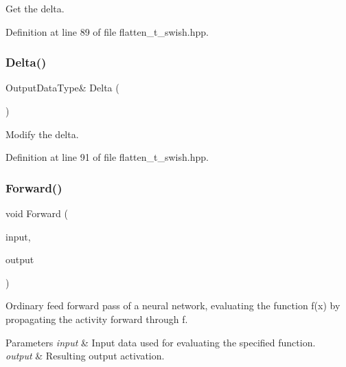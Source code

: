Get the delta. 



Definition at line 89 of file flatten\+\_\+t\+\_\+swish.\+hpp.

\mbox{\label{classmlpack_1_1ann_1_1FlattenTSwish_ad6601342d560219ce951d554e69e5e87}} 
\subsubsection{Delta()\hspace{0.1cm}{\footnotesize\ttfamily [2/2]}}
{\footnotesize\ttfamily Output\+Data\+Type\& Delta (\begin{DoxyParamCaption}{ }\end{DoxyParamCaption})\hspace{0.3cm}{\ttfamily [inline]}}



Modify the delta. 



Definition at line 91 of file flatten\+\_\+t\+\_\+swish.\+hpp.

\mbox{\label{classmlpack_1_1ann_1_1FlattenTSwish_a09440df0a90bdcc766e56e097d91205b}} 
\subsubsection{Forward()}
{\footnotesize\ttfamily void Forward (\begin{DoxyParamCaption}\item[{const Input\+Type \&}]{input,  }\item[{Output\+Type \&}]{output }\end{DoxyParamCaption})}



Ordinary feed forward pass of a neural network, evaluating the function f(x) by propagating the activity forward through f. 


\begin{DoxyParams}{Parameters}
{\em input} & Input data used for evaluating the specified function. \\
\hline
{\em output} & Resulting output activation. \\
\hline
\end{DoxyParams}
\mbox{\label{classmlpack_1_1ann_1_1FlattenTSwish_a0ee21c2a36e5abad1e7a9d5dd00849f9}} 
